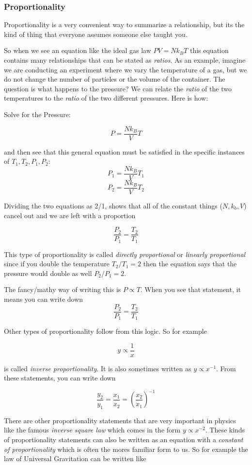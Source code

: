 \documentclass[11pt]{article}
\begin{document}
\subsubsection{Proportionality}\label{proportionality}

Proportionality is a very convenient way to summarize a relationship,
but its the kind of thing that everyone assumes someone else taught you.

So when we see an equation like the ideal gas law \(P V = N k_B T\) this
equation contains many relationships that can be stated as
\emph{ratios}. As an example, imagine we are conducting an experiment
where we vary the temperature of a gas, but we do not change the number
of particles or the volume of the container. The question is what
happens to the pressure? We can relate the \emph{ratio} of the two
temperatures to the \emph{ratio} of the two different pressures. Here is
how:

Solve for the Pressure:

\[ P = \frac{N k_B}{V} T \]

and then see that this general equation must be satisfied in the
specific instances of \(T_1, T_2, P_1, P_2\):
\[ P_1 = \frac{N k_B}{V} T_1 \] \[ P_2 = \frac{N k_B}{V} T_2 \]

Dividing the two equations as 2/1, shows that all of the constant things
(\(N, k_b, V\)) cancel out and we are left with a proportion

\[\frac{P_2}{P_1} = \frac{T_2}{T_1}\]

This type of proportionality is called \emph{directly proportional} or
\emph{linearly proportional} since if you double the temperature
\(T_2/T_1 = 2\) then the equation says that the pressure would double as
well \(P_2/P_1 = 2\).

The fancy/mathy way of writing this is \(P \propto T\). When you see
that statement, it means you can write down
\[\frac{P_2}{P_1} = \frac{T_2}{T_1}\]

Other types of proportionality follow from this logic. So for example

\[ y \propto \frac{1}{x} \]

is called \emph{inverse proportionality}. It is also sometimes written
as \(y \propto x^{-1}\). From these statements, you can write down

\[ \frac{y_2}{y_1} = \frac{x_1}{x_2} = \left(\frac{x_2}{x_1}\right)^{-1} \]

There are other proportionality statements that are very important in
physics like the famous \emph{inverse square law} which comes in the
form \(y \propto x^{-2}\). These kinds of proportionality statements can
also be written as an equation with a \emph{constant of proportionality}
which is often the mores familiar form to us. So for example the law of
Universal Gravitation can be written like
\end{document}
